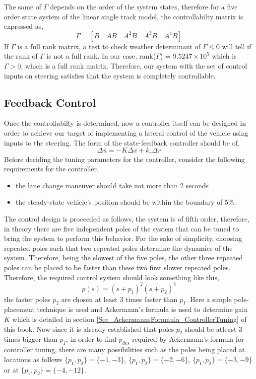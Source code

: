 The same of $\Gamma$ depends on the order of the system states, therefore for a five order state system of the linear single track model, the controllabilty matrix is expressed as,
\begin{equation}
	\Gamma = [B \quad AB \quad A^2 B \quad A^3 B \quad A^4 B]
\end{equation}
If $\Gamma$ is a full rank matrix, a test to check weather determinant of $\Gamma \leq 0$ will tell if the rank of $\Gamma$ is not a full rank. In our case, rank($\Gamma$) = $9.5247\times10^5$ which is $\Gamma > 0$, which is a full rank matrix. Therefore, our system with the set of control inputs on steering satisfies that the system is completely controllable. 

\subsection{Feedback Control}

Once the controllabilty is determined, now a controller itself can be designed in order to achieve our target of implementing a lateral control of the vehicle using inputs to the steering. The form of the state-feedback controller should be of,
\begin{equation}
	\Delta u = - K \Delta x + k_r \Delta r
\end{equation}
Before deciding the tuning parameters for the controller, consider the following requirements for the controller.
\begin{itemize}
	\item the lane change maneuver should take not more than 2 seconds
	\item the steady-state vehicle's position should be within the boundary of 5$\%$.
\end{itemize}

The control design is proceeded as follows, the system is of fifth order, therefore, in theory there are five independent poles of the system that can be tuned to bring the system to perform this behavior. For the sake of simplicity, choosing repeated poles such that two repeated poles determine the dynamics of the system. Therefore, being the slowest of the five poles, the other three repeated poles can be placed to be faster than these two first slower repeated poles. Therefore, the required control system should look something like this,
\begin{equation}
	p(s) = (s + p_1)^2 (s + p_2)^3
\end{equation}
the faster poles $p_2$ are chosen at least 3 times faster than $p_1$. Here a simple pole-placement technique is used and Ackermann's formula is used to determine gain $K$ which is detailed in section \ref{Sec_AckermannsFormaula_ControllerTuning} of this book. Now since it is already established that poles $p_2$ should be atleast 3 times bigger than $p_1$, in order to find $p_{des}$ required by Ackermann's formula for controller tuning, there are many possibilities such as the poles being placed at locations as follows $\{p_1, p_2\} = \{ -1,-3 \}$, $\{p_1, p_2\} = \{ -2,-6 \}$, $\{p_1, p_2\} = \{ -3,-9 \}$ or at $\{p_1, p_2\} = \{ -4,-12 \}$. 

